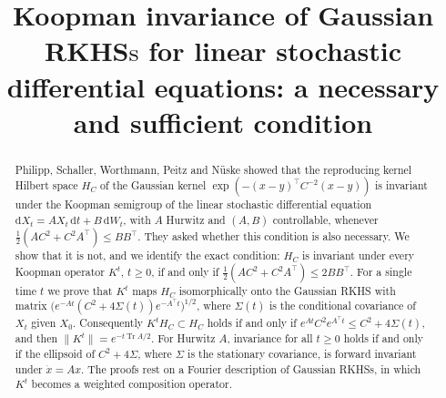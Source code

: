 \documentclass[11pt]{amsart}
\numberwithin{equation}{section}
\theoremstyle{definition}
\theoremstyle{remark}
\newcommand{\Tr}{\operatorname{Tr}}
\newcommand{\tp}{\top}
\begin{document}
\title[Koopman invariance of Gaussian RKHS$\text{s}$]{Koopman invariance of Gaussian RKHS$\text{s}$ for linear
stochastic differential equations: a necessary and sufficient condition}



\begin{abstract}
Philipp, Schaller, Worthmann, Peitz and N\"uske showed that the reproducing kernel Hilbert space $H_C$ of the
Gaussian kernel $\exp(-(x-y)^\tp C^{-2}(x-y))$ is invariant under the Koopman semigroup of the linear stochastic
differential equation $\mathrm dX_t=AX_t\,\mathrm dt+B\,\mathrm dW_t$, with $A$ Hurwitz and $(A,B)$ controllable,
whenever $\frac12(AC^2+C^2A^\tp)\le BB^\tp$. They asked whether this condition is also necessary. We show that it is not,
and we identify the exact condition: $H_C$ is invariant under every Koopman operator $K^t$, $t\ge0$, if and only if
$\frac12(AC^2+C^2A^\tp)\le 2BB^\tp$. For a single time $t$ we prove that $K^t$ maps $H_C$ isomorphically onto the
Gaussian RKHS with matrix $\bigl(e^{-At}(C^2+4\Sigma(t))e^{-A^\tp t}\bigr)^{1/2}$, where $\Sigma(t)$ is the conditional
covariance of $X_t$ given $X_0$. Consequently $K^tH_C\subset H_C$ holds if and only if
$e^{At}C^2e^{A^\tp t}\le C^2+4\Sigma(t)$, and then $\|K^t\|=e^{-t\Tr A/2}$. For Hurwitz $A$, invariance for all
$t\ge0$ holds if and only if the ellipsoid of $C^2+4\Sigma$, where $\Sigma$ is the stationary covariance, is forward
invariant under $\dot x=Ax$. The proofs rest on a Fourier description of Gaussian RKHSs, in which $K^t$ becomes a weighted
composition operator.
\end{abstract}

\maketitle

\end{document}

